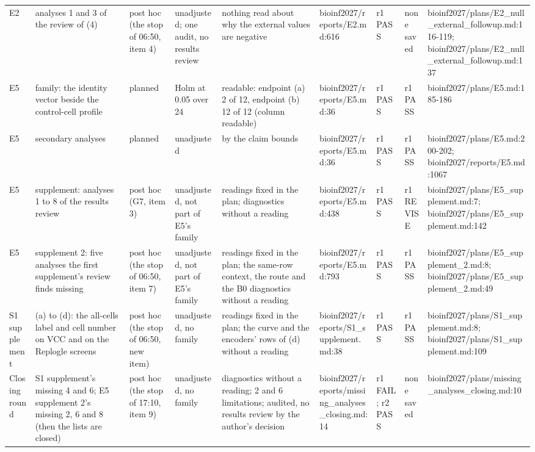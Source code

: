 \begin{tabular}{lllllllll}
E2 & analyses 1 and 3 of the review of (4) & post hoc (the stop of 06:50, item 4) & unadjusted; one audit, no results review & nothing read about why the external values are negative & bioinf2027/reports/E2.md:616 & r1 PASS & none saved & bioinf2027/plans/E2\_null\_external\_followup.md:116-119; bioinf2027/plans/E2\_null\_external\_followup.md:137 \\
E5 & family: the identity vector beside the control-cell profile & planned & Holm at 0.05 over 24 & readable: endpoint (a) 2 of 12, endpoint (b) 12 of 12 (column readable) & bioinf2027/reports/E5.md:36 & r1 PASS & r1 PASS & bioinf2027/plans/E5.md:185-186 \\
E5 & secondary analyses & planned & unadjusted & by the claim bounds & bioinf2027/reports/E5.md:36 & r1 PASS & r1 PASS & bioinf2027/plans/E5.md:200-202; bioinf2027/reports/E5.md:1067 \\
E5 & supplement: analyses 1 to 8 of the results review & post hoc (G7, item 3) & unadjusted, not part of E5's family & readings fixed in the plan; diagnostics without a reading & bioinf2027/reports/E5.md:438 & r1 PASS & r1 REVISE & bioinf2027/plans/E5\_supplement.md:7; bioinf2027/plans/E5\_supplement.md:142 \\
E5 & supplement 2: five analyses the first supplement's review finds missing & post hoc (the stop of 06:50, item 7) & unadjusted, not part of E5's family & readings fixed in the plan; the same-row context, the route and the B0 diagnostics without a reading & bioinf2027/reports/E5.md:793 & r1 PASS & r1 PASS & bioinf2027/plans/E5\_supplement\_2.md:8; bioinf2027/plans/E5\_supplement\_2.md:49 \\
S1 supplement & (a) to (d): the all-cells label and cell number on VCC and on the Replogle screens & post hoc (the stop of 06:50, new item) & unadjusted, no family & readings fixed in the plan; the curve and the encoders' rows of (d) without a reading & bioinf2027/reports/S1\_supplement.md:38 & r1 PASS & r1 PASS & bioinf2027/plans/S1\_supplement.md:8; bioinf2027/plans/S1\_supplement.md:109 \\
Closing round & S1 supplement's missing 4 and 6; E5 supplement 2's missing 2, 6 and 8 (then the lists are closed) & post hoc (the stop of 17:10, item 9) & unadjusted, no family & diagnostics without a reading; 2 and 6 limitations; audited, no results review by the author's decision & bioinf2027/reports/missing\_analyses\_closing.md:14 & r1 FAIL; r2 PASS & none saved & bioinf2027/plans/missing\_analyses\_closing.md:10 \\
\bottomrule
\end{tabular}
